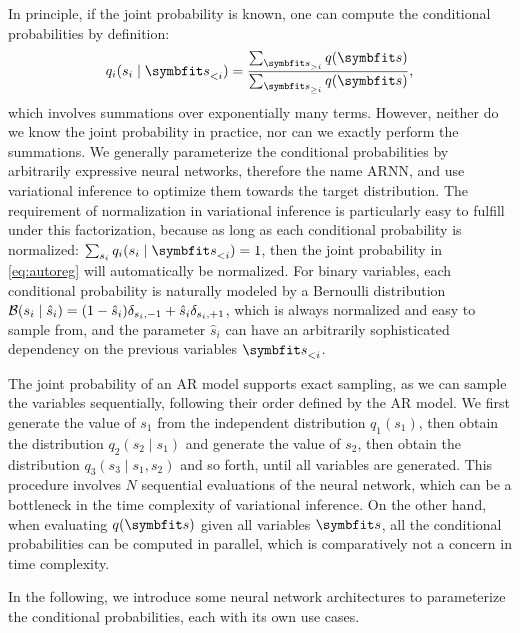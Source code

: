 In principle, if the joint probability is known, one can compute the conditional probabilities by definition:
\begin{equation}
q_i(s_i \mid \vs_{< i}) = \frac{\sum_{\vs_{> i}} q(\vs)}{\sum_{\vs_{\ge i}} q(\vs)},
\end{equation}
which involves summations over exponentially many terms. However, neither do we know the joint probability in practice, nor can we exactly perform the summations. We generally parameterize the conditional probabilities by arbitrarily expressive neural networks, therefore the name ARNN, and use variational inference to optimize them towards the target distribution. The requirement of normalization in variational inference is particularly easy to fulfill under this factorization, because as long as each conditional probability is normalized: $\sum_{s_i} q_i(s_i \mid \vs_{< i}) = 1$, then the joint probability in \cref{eq:autoreg} will automatically be normalized. For binary variables, each conditional probability is naturally modeled by a Bernoulli distribution $\mathcal{B}(s_i \mid \hat{s}_i) = (1 - \hat{s}_i) \delta_{s_i, -1} + \hat{s}_i \delta_{s_i, +1}$, which is always normalized and easy to sample from, and the parameter $\hat{s}_i$ can have an arbitrarily sophisticated dependency on the previous variables $\vs_{< i}$.

The joint probability of an AR model supports exact sampling, as we can sample the variables sequentially, following their order defined by the AR model. We first generate the value of $s_1$ from the independent distribution $q_1(s_1)$, then obtain the distribution $q_2(s_2 \mid s_1)$ and generate the value of $s_2$, then obtain the distribution $q_3(s_3 \mid s_1, s_2)$ and so forth, until all variables are generated. This procedure involves $N$ sequential evaluations of the neural network, which can be a bottleneck in the time complexity of variational inference. On the other hand, when evaluating $q(\vs)$ given all variables $\vs$, all the conditional probabilities can be computed in parallel, which is comparatively not a concern in time complexity.

In the following, we introduce some neural network architectures to parameterize the conditional probabilities, each with its own use cases.

